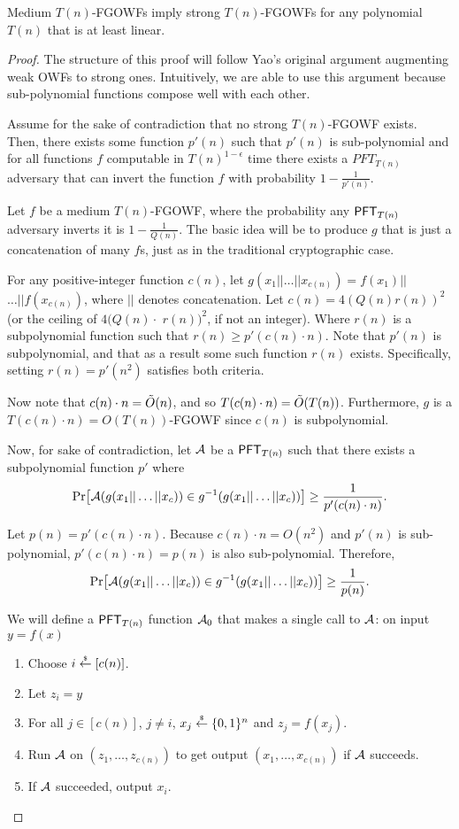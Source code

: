 \begin{claim}\label{clm:medium-strong-owf}
	Medium $T(n)$-FGOWFs imply strong $T(n)$-FGOWFs for any polynomial $T(n)$ that is at least linear.
\end{claim}
\begin{proof}
	The structure of this proof will follow Yao's original argument augmenting weak OWFs to strong ones. Intuitively, we are able to use this argument because sub-polynomial functions compose well with each other.
	
	Assume for the sake of contradiction that no strong $T(n)$-FGOWF exists. Then, there exists some function $p'(n)$ such that $p'(n)$ is sub-polynomial and for all functions $f$ computable in $T(n)^{1-\epsilon}$ time there exists a $PFT_{T(n)}$ adversary that can invert the function $f$ with probability $1-\frac{1}{p'(n)}$.
	
	Let $f$ be a medium $T(n)$-FGOWF, where the probability any $\PFT{T(n)}$ adversary inverts it is $1 - \frac 1 {Q(n)}$. The basic idea will be to produce $g$ that is just a concatenation of many $f$s, just as in the traditional cryptographic case.
	
	For any positive-integer function $c(n)$, let $g(x_1 || \dots || x_{c(n)}) = f(x_1)||$ $\dots ||f(x_{c(n)})$, where $||$ denotes concatenation.
	Let $c(n) = 4 \left( Q(n)r(n) \right)^2$ (or the ceiling of $4 ( Q(n)\cdot $ $r(n))^2$, if not an integer). 	Where $r(n)$ is a subpolynomial function such that $r(n) \ge p'(c(n) \cdot n)$. Note that $p'(n)$ is subpolynomial, and that as a result some such function $r(n)$ exists. Specifically, setting $r(n) = p'(n^2)$ satisfies both criteria.
	
	Now note that $c(n) \cdot n = \~O(n)$, and so $T(c(n) \cdot n) = \~O(T(n))$. Furthermore, $g$ is a $T(c(n) \cdot n) = O(T(n))$-FGOWF since $c(n)$ is subpolynomial.
	
	Now, for sake of contradiction, let $\cA$ be a $\PFT{T(n)}$ such that there exists a subpolynomial function $p'$ where
	\[\Pr\bigl[\cA(g(x_1 || \dots || x_c)) \in g^{-1}(g(x_1 || \dots || x_c))\bigr] \ge \frac 1 {p'(c(n) \cdot n)}.\]
	
	
	Let $p(n) = p'(c(n) \cdot n)$. Because $c(n)\cdot n = O(n^2)$ and $p'(n)$ is sub-polynomial, $p'(c(n) \cdot n) = p(n)$ is also sub-polynomial. Therefore,
	\[\Pr\bigl[\cA(g(x_1 || \dots || x_c)) \in g^{-1}(g(x_1 || \dots || x_c))\bigr] \ge \frac 1 {p(n)}.\]

	We will define a $\PFT{T(n)}$ function $\cA_0$ that makes a single call to $\cA$: on input $y = f(x)$
	\begin{enumerate}
		\item Choose $i \getsr [c(n)]$.
		\item Let $z_i = y$
		\item For all $j \in [c(n)]$, $j \neq i$, $x_j \getsr \{0,1\}^n$ and $z_j = f(x_j)$.
		\item Run $\cA$ on $(z_1, \dots, z_{c(n)})$ to get output $(x_1, \dots, x_{c(n)})$ if $\cA$ succeeds.
		\item If $\cA$ succeeded, output $x_i$.
	\end{enumerate}
	

\end{proof}
